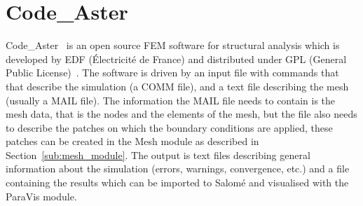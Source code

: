 \section{Code\_Aster} %
\label{sec:code_aster}
Code\_Aster~\cite{codeaster} is an open source FEM software for structural analysis which is developed by EDF (Électricité de France) and distributed under GPL (General Public License)~\cite{gpl}. The software is driven by an input file with commands that that describe the simulation (a COMM file), and a text file describing the mesh (usually a MAIL file). The information the MAIL file needs to contain is the mesh data, that is the nodes and the elements of the mesh, but the file also needs to describe the patches on which the boundary conditions are applied, these patches can be created in the Mesh module as described in Section~\ref{sub:mesh_module}. The output is text files describing general information about the simulation (errors, warnings, convergence, etc.) and a file containing the results which can be imported to Salomé and visualised with the ParaVis module. 

